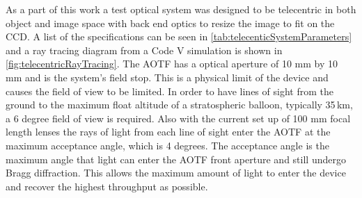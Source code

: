 
As a part of this work a test optical system was designed to be telecentric in both object and image space with back end optics to resize the image to fit on the CCD. A list of the specifications can be seen in \autoref{tab:telecenticSystemParameters} and a ray tracing diagram from a Code V simulation is shown in \autoref{fig:telecentricRayTracing}. The AOTF has a optical aperture of 10 mm by 10 mm and is the system's field stop. This is a physical limit of the device and causes the field of view to be limited. In order to have lines of sight from the ground to the maximum float altitude of a stratospheric balloon, typically 35\,km, a 6 degree field of view is required. Also with the current set up of 100 mm focal length lenses the rays of light from each line of sight enter the AOTF at the maximum acceptance angle, which is 4 degrees. The acceptance angle is the maximum angle that light can enter the AOTF front aperture and still undergo Bragg diffraction. This allows the maximum amount of light to enter the device and recover the highest throughput as possible.


